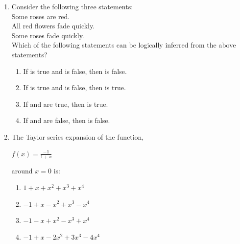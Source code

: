 \documentclass[journal,12pt,onecolumn]{IEEEtran}
\theoremstyle{remark}
\begin{document}
\begin{enumerate}
\begin{center}
\begin{enumerate}
\end{enumerate}
\end{center}

\pagebreak

\item Consider the following three statements:\\

\noindent	
{} Some roses are red.\\
 All red flowers fade quickly.\\
 Some roses fade quickly.\\

\noindent
Which of the following statements can be logically inferred from the above statements?

\hfill{}

\begin{enumerate}
\item If  is true and  is false, then  is false.
\item If  is true and  is false, then  is true.
\item If  and  are true, then  is true.
\item If  and  are false, then  is false.
\end{enumerate}

\item The Taylor series expansion of the function,

\hfill{}

\begin{center}
{\Large $f(x) = \frac{-1}{1+x}$}
\end{center}

\noindent
around $x = 0$  is:

\begin{enumerate}
\item $ 1 + x + x^2 + x^3 + x^4$
\item $ -1 + x - x^2 + x^3 - x^4$
\item $ -1 - x + x^2 - x^3 + x^4$
\item $ -1 + x - 2x^2 + 3x^3 - 4x^4$
\end{enumerate}


\end{enumerate}
\end{document}
